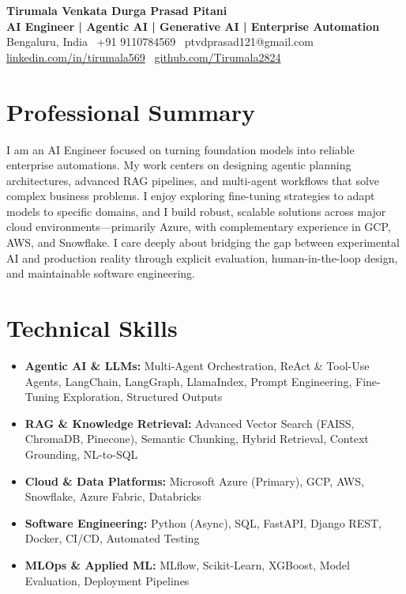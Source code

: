 \documentclass[a4paper,10pt]{article}
\begin{document}
\begin{center}
    \vspace*{-1.0cm}
    {\LARGE \textbf{\color{primary}Tirumala Venkata Durga Prasad Pitani}} \\[0.3em]
    \textbf{AI Engineer | Agentic AI | Generative AI | Enterprise Automation} \\[0.2em]
    Bengaluru, India \textbullet\ +91 9110784569 \textbullet\ ptvdprasad121@gmail.com \\[0.1em]
    \href{https://linkedin.com/in/tirumala569}{linkedin.com/in/tirumala569} \textbullet\ \href{https://github.com/Tirumala2824}{github.com/Tirumala2824}
\end{center}

\vspace{-1.0em}

\section*{Professional Summary}
I am an AI Engineer focused on turning foundation models into reliable enterprise automations. My work centers on designing agentic planning architectures, advanced RAG pipelines, and multi-agent workflows that solve complex business problems. I enjoy exploring fine-tuning strategies to adapt models to specific domains, and I build robust, scalable solutions across major cloud environments—primarily Azure, with complementary experience in GCP, AWS, and Snowflake. I care deeply about bridging the gap between experimental AI and production reality through explicit evaluation, human-in-the-loop design, and maintainable software engineering.

\section*{Technical Skills}
\begin{itemize}
    \item \textbf{Agentic AI \& LLMs:} Multi-Agent Orchestration, ReAct \& Tool-Use Agents, LangChain, LangGraph, LlamaIndex, Prompt Engineering, Fine-Tuning Exploration, Structured Outputs
    \item \textbf{RAG \& Knowledge Retrieval:} Advanced Vector Search (FAISS, ChromaDB, Pinecone), Semantic Chunking, Hybrid Retrieval, Context Grounding, NL-to-SQL
    \item \textbf{Cloud \& Data Platforms:} Microsoft Azure (Primary), GCP, AWS, Snowflake, Azure Fabric, Databricks
    \item \textbf{Software Engineering:} Python (Async), SQL, FastAPI, Django REST, Docker, CI/CD, Automated Testing
    \item \textbf{MLOps \& Applied ML:} MLflow, Scikit-Learn, XGBoost, Model Evaluation, Deployment Pipelines
\end{itemize}
\end{document}
